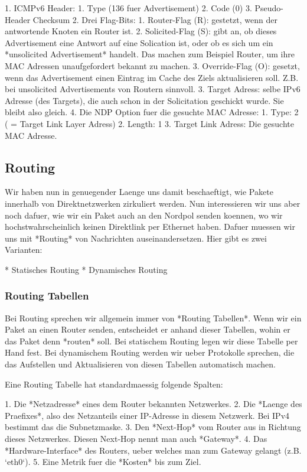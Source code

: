 1. ICMPv6 Header:
   1. Type (136 fuer Advertisement)
   2. Code (0)
   3. Pseudo-Header Checksum
2. Drei Flag-Bits:
   1. Router-Flag (R): gestetzt, wenn der antwortende Knoten ein Router ist.
   2. Solicited-Flag (S): gibt an, ob dieses Advertisement eine Antwort auf eine
      Solication ist, oder ob es sich um ein *unsolicited Advertisement*
      handelt. Das machen zum Beispiel Router, um ihre MAC Adressen
      unaufgefordert bekannt zu machen.
   3. Override-Flag (O): gesetzt, wenn das Advertisement einen Eintrag im Cache
      des Ziels aktualisieren soll. Z.B. bei unsolicited Advertisements von
      Routern sinnvoll.
3. Target Adress: selbe IPv6 Adresse (des Targets), die auch schon in der
   Solicitation geschickt wurde. Sie bleibt also gleich.
4. Die NDP Option fuer die gesuchte MAC Adresse:
   1. Type: 2 ( = Target Link Layer Adress)
   2. Length: 1
   3. Target Link Adress: Die gesuchte MAC Adresse.

\subsection{Routing} 

Wir haben nun in genuegender Laenge uns damit beschaeftigt, wie Pakete innerhalb
von Direktnetzwerken zirkuliert werden. Nun interessieren wir uns aber noch
dafuer, wie wir ein Paket auch an den Nordpol senden koennen, wo wir
hochstwahrscheinlich keinen Direktlink per Ethernet haben. Dafuer muessen wir
uns mit *Routing* von Nachrichten auseinandersetzen. Hier gibt es zwei
Varianten:

* Statisches Routing
* Dynamisches Routing

\subsubsection{Routing Tabellen} 

Bei Routing sprechen wir allgemein immer von *Routing Tabellen*. Wenn wir ein
Paket an einen Router senden, entscheidet er anhand dieser Tabellen, wohin er
das Paket denn *routen* soll. Bei statischem Routing legen wir diese Tabelle per
Hand fest. Bei dynamischem Routing werden wir ueber Protokolle sprechen, die das
Aufstellen und Aktualisieren von diesen Tabellen automatisch machen.

Eine Routing Tabelle hat standardmaessig folgende Spalten:

1. Die *Netzadresse* eines dem Router bekannten Netzwerkes.
2. Die *Laenge des Praefixes*, also des Netzanteils einer IP-Adresse in diesem
   Netzwerk. Bei IPv4 bestimmt das die Subnetzmaske.
3. Den *Next-Hop* vom Router aus in Richtung dieses Netzwerkes. Diesen Next-Hop
   nennt man auch *Gateway*.
4. Das *Hardware-Interface* des Routers, ueber welches man zum Gateway gelangt
   (z.B. `eth0`).
5. Eine Metrik fuer die *Kosten* bis zum Ziel.

